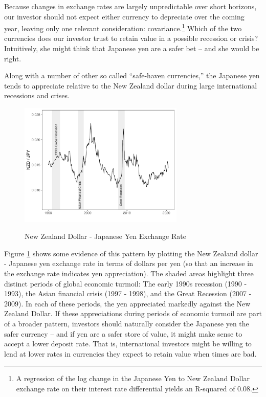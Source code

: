 \documentclass{ar-1col}
\begin{document}
Because changes in exchange rates are largely unpredictable over short
horizons, our investor should not expect either currency to depreciate
over the coming year, leaving only one relevant consideration:
covariance.\footnote{A regression of the log change in the Japanese Yen 
to New Zealand Dollar exchange rate on their interest rate differential yields an R-squared of
0.08.} Which of the two currencies does our investor trust to
retain value in a possible recession or crisis? Intuitively, she might
think that Japanese yen are a safer bet -- and she would be right.

Along with a number of other so called ``safe-haven currencies,'' the
Japanese yen tends to appreciate relative to the New Zealand dollar
during large international recessions and crises. 
\begin{figure}[htp!]
  \centering
  \caption{New Zealand Dollar - Japanese Yen Exchange Rate}
  \includegraphics[width=0.7\textwidth]{Exhibits/Figure_FX_JPYNZD.pdf}
  \label{fig:spot}
\end{figure}
Figure \ref{fig:spot} shows some evidence of this pattern by plotting the New Zealand dollar - Japanese yen exchange
rate in terms of dollars per yen (so that an increase in the exchange rate
indicates yen appreciation). The shaded areas highlight three distinct
periods of global economic turmoil: The early 1990s recession (1990 -
1993), the Asian financial crisis (1997 - 1998), and the Great
Recession (2007 - 2009). In each of these periods, the yen appreciated
markedly against the New Zealand Dollar. If these appreciations during
periods of economic turmoil are part of a broader pattern, investors
should naturally consider the Japanese yen the safer currency -- and
if yen are a safer
store of value, it might make sense to accept a lower deposit rate.
That is, international investors might be willing to lend at lower
rates in currencies they expect to retain value when times are bad.
\end{document}
